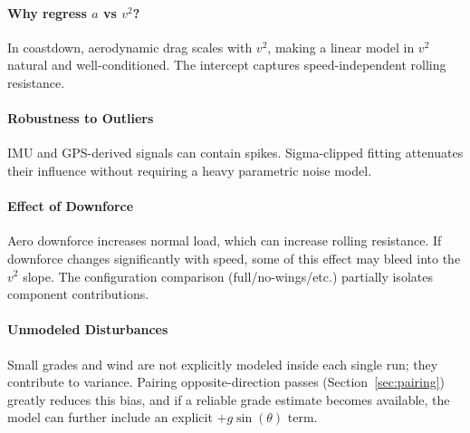 \documentclass[11pt,a4paper]{article}
\begin{document}
\paragraph{Why regress $a$ vs $v^2$?} In coastdown, aerodynamic drag scales with $v^2$, making a linear model in $v^2$ natural and well-conditioned. The intercept captures speed-independent rolling resistance.

\paragraph{Robustness to Outliers} IMU and GPS-derived signals can contain spikes. Sigma-clipped fitting attenuates their influence without requiring a heavy parametric noise model.

\paragraph{Effect of Downforce} Aero downforce increases normal load, which can increase rolling resistance. If downforce changes significantly with speed, some of this effect may bleed into the $v^2$ slope. The configuration comparison (full/no-wings/etc.) partially isolates component contributions.

\paragraph{Unmodeled Disturbances} Small grades and wind are not explicitly modeled inside each single run; they contribute to variance. Pairing opposite-direction passes (Section~\ref{sec:pairing}) greatly reduces this bias, and if a reliable grade estimate becomes available, the model can further include an explicit $+g\sin(\theta)$ term.
\end{document}
